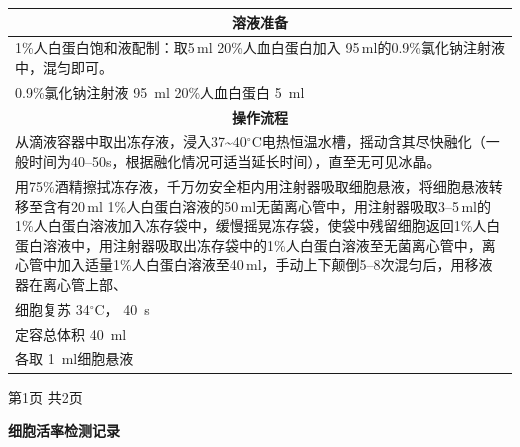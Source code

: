 \documentclass[UTF8,10pt,a4paper,fontset=fandol]{ctexart}
\newcommand{\fieldvalue}[1]{#1}
\newcommand{\handwritten}[1]{#1}
\begin{document}
\begin{center}
\begin{center}
\noindent
\begin{tabularx}{\textwidth}{|X|}
\hline
\multicolumn{1}{|c|}{\textbf{溶液准备}}\\
\hline
1\%人白蛋白饱和液配制：取5\,ml 20\%人血白蛋白加入
95\,ml的0.9\%氯化钠注射液中，混匀即可。\\[2pt]
0.9\%氯化钠注射液\quad
\fieldvalue{\handwritten{95}}\ ml
\hfill
20\%人血白蛋白\quad
\fieldvalue{\handwritten{5}}\ ml\\
\hline
\multicolumn{1}{|c|}{\textbf{操作流程}}\\
\hline
从滴液容器中取出冻存液，浸入37\textasciitilde40\({}^{\circ}\)C电热恒温水槽，摇动含其尽快融化（一般时间为40--50s，根据融化情况可适当延长时间），直至无可见冰晶。\\
用75\%酒精擦拭冻存液，千万勿安全柜内用注射器吸取细胞悬液，将细胞悬液转移至含有20\,ml 1\%人白蛋白溶液的50\,ml无菌离心管中，用注射器吸取3--5\,ml的1\%人白蛋白溶液加入冻存袋中，缓慢摇晃冻存袋，使袋中残留细胞返回1\%人白蛋白溶液中，用注射器吸取出冻存袋中的1\%人白蛋白溶液至无菌离心管中，离心管中加入适量1\%人白蛋白溶液至40\,ml，手动上下颠倒5--8次混匀后，用移液器在离心管上部、\\[3pt]
细胞复苏\quad
\fieldvalue{\handwritten{34}}\({}^{\circ}\)C，
\quad
\fieldvalue{\handwritten{40}}\ s\\[3pt]
定容总体积\quad
\fieldvalue{\handwritten{40}}\ ml\\[3pt]
各取\quad
\fieldvalue{\handwritten{1}}\ ml细胞悬液\\
\hline
\end{tabularx}

\begin{center}
第1页 共2页
\end{center}


\newpage

\begin{center}
\textbf{细胞活率检测记录}
\end{center}


\end{center}
\end{center}
\end{document}
